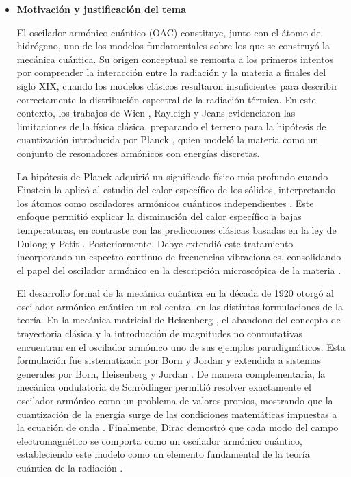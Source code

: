 \documentclass[11pt,a4paper,spanish]{book}
\begin{document}
\begin{itemize}
	
	\item \textbf{Motivación y justificación del tema}
	
	El oscilador armónico cuántico (OAC) constituye, junto con el átomo de hidrógeno, uno de los modelos fundamentales sobre los que se construyó la mecánica cuántica. Su origen conceptual se remonta a los primeros intentos por comprender la interacción entre la radiación y la materia a finales del siglo XIX, cuando los modelos clásicos resultaron insuficientes para describir correctamente la distribución espectral de la radiación térmica. En este contexto, los trabajos de Wien \citep{wien1896}, Rayleigh \citep{rayleigh1900} y Jeans \citep{jeans1905} evidenciaron las limitaciones de la física clásica, preparando el terreno para la hipótesis de cuantización introducida por Planck \citep{planck1901}, quien modeló la materia como un conjunto de resonadores armónicos con energías discretas.
	
	La hipótesis de Planck adquirió un significado físico más profundo cuando Einstein la aplicó al estudio del calor específico de los sólidos, interpretando los átomos como osciladores armónicos cuánticos independientes \citep{einstein1907}. Este enfoque permitió explicar la disminución del calor específico a bajas temperaturas, en contraste con las predicciones clásicas basadas en la ley de Dulong y Petit \citep{dulong1819}. Posteriormente, Debye extendió este tratamiento incorporando un espectro continuo de frecuencias vibracionales, consolidando el papel del oscilador armónico en la descripción microscópica de la materia \citep{debye1912}.
	
	El desarrollo formal de la mecánica cuántica en la década de 1920 otorgó al oscilador armónico cuántico un rol central en las distintas formulaciones de la teoría. En la mecánica matricial de Heisenberg \citep{heisenberg1925}, el abandono del concepto de trayectoria clásica y la introducción de magnitudes no conmutativas encuentran en el oscilador armónico uno de sus ejemplos paradigmáticos. Esta formulación fue sistematizada por Born y Jordan \citep{born1925} y extendida a sistemas generales por Born, Heisenberg y Jordan \citep{bornheisenberg1926}. De manera complementaria, la mecánica ondulatoria de Schrödinger permitió resolver exactamente el oscilador armónico como un problema de valores propios, mostrando que la cuantización de la energía surge de las condiciones matemáticas impuestas a la ecuación de onda \citep{schrodinger1926a, schrodinger1926b}. Finalmente, Dirac demostró que cada modo del campo electromagnético se comporta como un oscilador armónico cuántico, estableciendo este modelo como un elemento fundamental de la teoría cuántica de la radiación \citep{dirac1927}.
	

\end{itemize}
\end{document}
